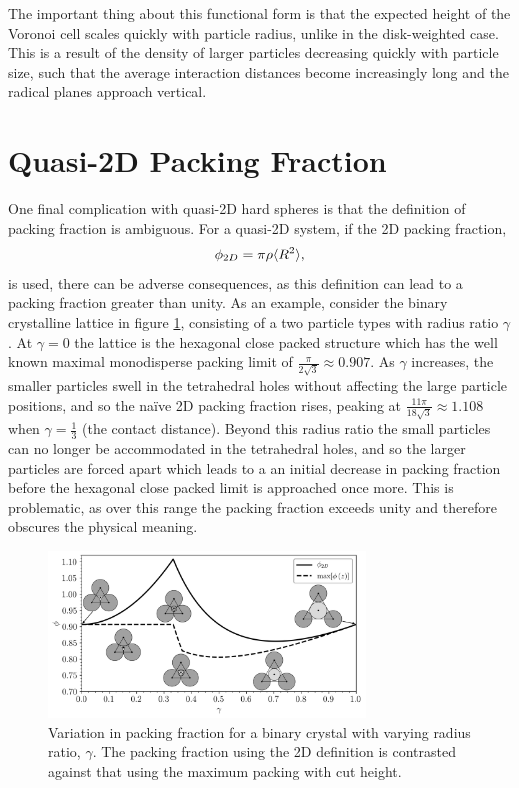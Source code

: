 The important thing about this functional form is that the expected height of the Voronoi cell scales quickly with particle radius, unlike in the disk\--weighted case.
This is a result of the density of larger particles decreasing quickly with particle size, such that the average interaction distances become increasingly long and the radical planes approach vertical.

\section{Quasi\--2D Packing Fraction}
\label{s:qtdpackingfrac}

One final complication with quasi\--2D hard spheres is that the definition of packing fraction is ambiguous.
For a quasi\--2D system, if the 2D packing fraction,
\begin{equation}
	\label{eq:simplepackingfrac}
	\phi_{2D}=\pi\rho\langle R^2\rangle,
\end{equation}
is used, there can be adverse consequences, as this definition can lead to a packing fraction greater than unity.
As an example, consider the binary crystalline lattice in figure \ref{fig:crystalpackingfrac}, consisting of a two particle types with radius ratio $\gamma$.
At $\gamma=0$ the lattice is the hexagonal close packed structure which has the well known maximal monodisperse packing limit of $\frac{\pi}{2\sqrt{3}}\approx0.907$.
As $\gamma$ increases, the smaller particles swell in the tetrahedral holes without affecting the large particle positions, and so the na\"ive 2D packing fraction rises, peaking at $\frac{11\pi}{18\sqrt{3}}\approx1.108$ when $\gamma=\frac{1}{3}$ (the contact distance).
Beyond this radius ratio the small particles can no longer be accommodated in the tetrahedral holes, and so the larger particles are forced apart which leads to a an initial decrease in packing fraction before the hexagonal close packed limit is approached once more.
This is problematic, as over this range the packing fraction exceeds unity and therefore obscures the physical meaning.

\begin{figure}[bt]
	\centering
	\includegraphics[width=0.75\textwidth]{./figures/quasi2d/max_packing.pdf}
	\caption{Variation in packing fraction for a binary crystal with varying radius ratio, $\gamma$. The packing fraction using the 2D definition is contrasted against that using the maximum packing with cut height.}
	\label{fig:crystalpackingfrac}
\end{figure}


